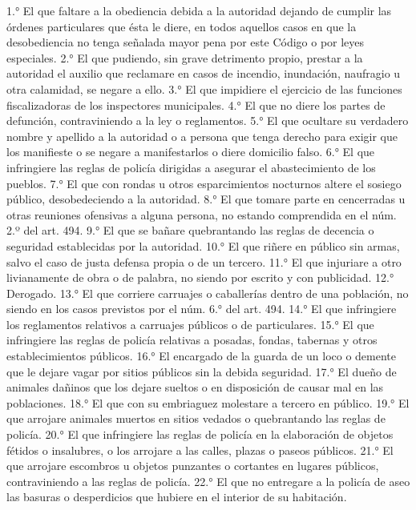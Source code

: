     1.° El que faltare a la obediencia debida a la autoridad dejando de cumplir las órdenes particulares que ésta le diere, en todos aquellos casos en que la desobediencia no tenga señalada mayor pena por este Código o por leyes especiales.
    2.° El que pudiendo, sin grave detrimento propio, prestar a la autoridad el auxilio que reclamare en casos de incendio, inundación, naufragio u otra calamidad, se negare a ello.
    3.° El que impidiere el ejercicio de las funciones fiscalizadoras de los inspectores municipales.
    4.° El que no diere los partes de defunción, contraviniendo a la ley o reglamentos.
    5.° El que ocultare su verdadero nombre y apellido a la autoridad o a persona que tenga derecho para exigir que los manifieste o se negare a manifestarlos o diere domicilio falso.
    6.° El que infringiere las reglas de policía dirigidas a asegurar el abastecimiento de los pueblos.
    7.° El que con rondas u otros esparcimientos nocturnos altere el sosiego público, desobedeciendo a la autoridad.
    8.° El que tomare parte en cencerradas u otras reuniones ofensivas a alguna persona, no estando comprendida en el núm. 2.º del art. 494.
    9.° El que se bañare quebrantando las reglas de decencia o seguridad establecidas por la autoridad.
    10.° El que riñere en público sin armas, salvo el caso de justa defensa propia o de un tercero.
    11.° El que injuriare a otro livianamente de obra o de palabra, no siendo por escrito y con publicidad.
    12.° Derogado.
    13.° El que corriere carruajes o caballerías dentro de una población, no siendo en los casos previstos por el núm. 6.° del art. 494.
    14.° El que infringiere los reglamentos relativos a carruajes públicos o de particulares.
    15.° El que infringiere las reglas de policía relativas a posadas, fondas, tabernas y otros establecimientos públicos.
    16.° El encargado de la guarda de un loco o demente que le dejare vagar por sitios públicos sin la debida seguridad.
    17.° El dueño de animales dañinos que los dejare sueltos o en disposición de causar mal en las poblaciones.
    18.° El que con su embriaguez molestare a tercero en público.
    19.° El que arrojare animales muertos en sitios vedados o quebrantando las reglas de policía.
    20.° El que infringiere las reglas de policía en la elaboración de objetos fétidos o insalubres, o los arrojare a las calles, plazas o paseos públicos.
    21.° El que arrojare escombros u objetos punzantes o cortantes en lugares públicos, contraviniendo a las reglas de policía.
    22.° El que no entregare a la policía de aseo las basuras o desperdicios que hubiere en el interior de su habitación.
